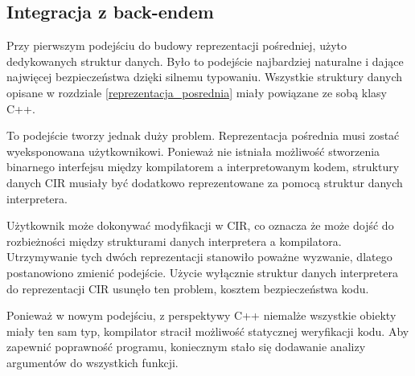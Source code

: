 \subsection{Integracja z back-endem}
\label{backend_integration}
Przy pierwszym podejściu do budowy reprezentacji pośredniej, użyto dedykowanych struktur danych. Było to podejście najbardziej naturalne i dające najwięcej bezpieczeństwa dzięki silnemu typowaniu. Wszystkie struktury danych opisane w rozdziale \ref{reprezentacja_posrednia} miały powiązane ze sobą klasy C++.


To podejście tworzy jednak duży problem. Reprezentacja pośrednia musi zostać wyeksponowana użytkownikowi. Ponieważ nie istniała możliwość stworzenia binarnego interfejsu między kompilatorem a interpretowanym kodem, struktury danych CIR musiały być dodatkowo reprezentowane za pomocą struktur danych interpretera.


Użytkownik może dokonywać modyfikacji w CIR, co oznacza że może dojść do rozbieżności między strukturami danych interpretera a kompilatora. Utrzymywanie tych dwóch reprezentacji stanowiło poważne wyzwanie, dlatego postanowiono zmienić podejście. Użycie wyłącznie struktur danych interpretera do reprezentacji CIR usunęło ten problem, kosztem bezpieczeństwa kodu.


Ponieważ w nowym podejściu, z perspektywy C++ niemalże wszystkie obiekty miały ten sam typ, kompilator stracił możliwość statycznej weryfikacji kodu.
Aby zapewnić poprawność programu, koniecznym stało się dodawanie analizy argumentów do wszystkich funkcji.
